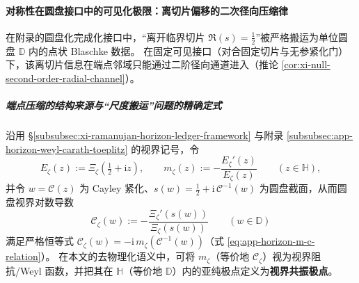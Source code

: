 \paragraph{对称性在圆盘接口中的可见化极限：离切片偏移的二次径向压缩律}
在附录的圆盘化完成化接口中，“离开临界切片 \(\Re(s)=\tfrac12\)”被严格搬运为单位圆盘 \(\mathbb{D}\) 内的点状 Blaschke 数据。
在固定可见接口（对合固定切片与无参紧化门）下，该离切片信息在端点邻域只能通过二阶径向通道进入（推论 \ref{cor:xi-null-second-order-radial-channel}）。

\subparagraph{端点压缩的结构来源与“尺度搬运”问题的精确定式}
沿用 \S\ref{subsubsec:xi-ramanujan-horizon-ledger-framework} 与附录 \ref{subsubsec:app-horizon-weyl-carath-toeplitz} 的视界记号，令
\[
E_{\zeta}(z):=\Xi_{\zeta}\!\left(\tfrac12+\mathrm{i}z\right),\qquad
m_{\zeta}(z):=-\frac{E_{\zeta}'(z)}{E_{\zeta}(z)}\qquad(z\in\mathbb{H}),
\]
并令 \(w=\mathcal{C}(z)\) 为 Cayley 紧化、\(s(w)=\tfrac12+\mathrm{i}\,\mathcal{C}^{-1}(w)\) 为圆盘截面，从而圆盘视界对数导数
\[
\mathscr{C}_{\zeta}(w):=-\frac{\Xi_{\zeta}'(s(w))}{\Xi_{\zeta}(s(w))}\qquad(w\in\mathbb{D})
\]
满足严格恒等式 \(\mathscr{C}_{\zeta}(w)=-\mathrm{i}\,m_{\zeta}(\mathcal{C}^{-1}(w))\)（式 \eqref{eq:app-horizon-m-c-relation}）。
在本文的去物理化语义中，可将 \(m_{\zeta}\)（等价地 \(\mathscr{C}_{\zeta}\)）视为视界阻抗/Weyl 函数，并把其在 \(\mathbb{H}\)（等价地 \(\mathbb{D}\)）内的亚纯极点定义为\textbf{视界共振极点}。

